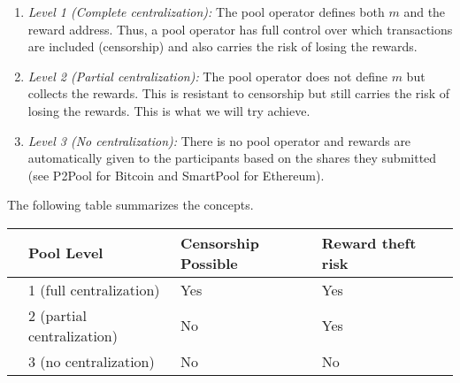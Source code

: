 \documentclass[11pt]{article}
\begin{document}
\begin{enumerate}
	\item {\em Level 1 (Complete centralization):} The pool operator defines both $m$ and the reward address. Thus, a pool operator has full control over which transactions are included (censorship) and also carries the risk of losing the rewards.
	\item {\em Level 2 (Partial centralization):} The pool operator does not define $m$ but collects the rewards. This is resistant to censorship but still carries the risk of losing the rewards. This is what we will try achieve.
	\item {\em Level 3 (No centralization):} There is no pool operator and rewards are automatically given to the participants based on the shares they submitted (see P2Pool for Bitcoin and SmartPool for Ethereum).
\end{enumerate}
The following table summarizes the concepts.\\

	\begin{tabular}{lllll}
		& Pool Level & Censorship Possible & Reward theft risk\\\hline
		& 1 (full centralization)    & Yes & Yes \\
		& 2 (partial centralization)    & No & Yes \\
		& 3 (no centralization)    & No & No 
	\end{tabular}


\end{document}
